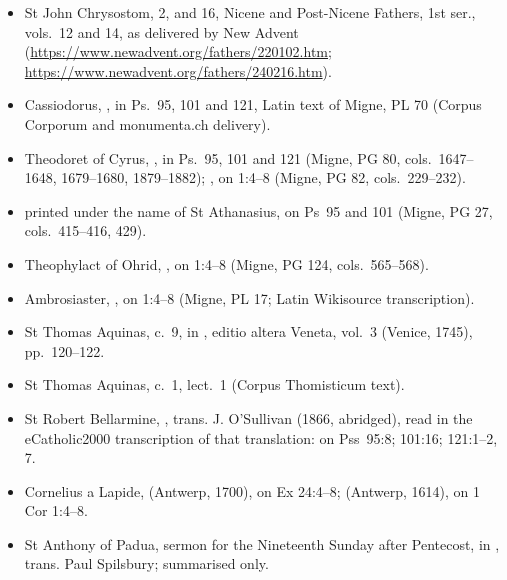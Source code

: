 {\begin{itemize}
\item St John Chrysostom,  2, and  16, Nicene and Post-Nicene Fathers, 1st ser., vols.~12 and 14, as delivered by New Advent (\url{https://www.newadvent.org/fathers/220102.htm}; \url{https://www.newadvent.org/fathers/240216.htm}).
\item Cassiodorus, , in Ps.~95, 101 and 121, Latin text of Migne, PL 70 (Corpus Corporum and monumenta.ch delivery).
\item Theodoret of Cyrus, , in Ps.~95, 101 and 121 (Migne, PG 80, cols.~1647--1648, 1679--1680, 1879--1882); , on 1:4--8 (Migne, PG 82, cols.~229--232).
\item {} printed under the name of St Athanasius, on Ps~95 and 101 (Migne, PG 27, cols.~415--416, 429).
\item Theophylact of Ohrid, , on 1:4--8 (Migne, PG 124, cols.~565--568).
\item Ambrosiaster, , on 1:4--8 (Migne, PL 17; Latin Wikisource transcription).
\item St Thomas Aquinas,  c.~9, in , editio altera Veneta, vol.~3 (Venice, 1745), pp.~120--122.
\item St Thomas Aquinas,  c.~1, lect.~1 (Corpus Thomisticum text).
\item St Robert Bellarmine, , trans. J. O'Sullivan (1866, abridged), read in the eCatholic2000 transcription of that translation: on Pss~95:8; 101:16; 121:1--2, 7.
\item Cornelius a Lapide,  (Antwerp, 1700), on Ex 24:4--8;  (Antwerp, 1614), on 1 Cor 1:4--8.
\item St Anthony of Padua, sermon for the Nineteenth Sunday after Pentecost, in , trans. Paul Spilsbury; summarised only.
\end{itemize}

}
